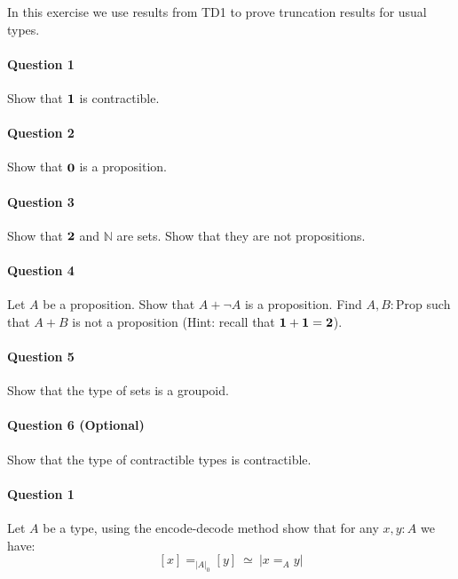 \documentclass{article}[6pt]%
\newcommand{\one}{{\bf 1}}
\newcommand{\zero}{{\bf 0}}
\newcommand{\two}{{\bf 2}}
\newcommand{\Prop}{\mathrm{Prop}}
\begin{document}

\begin{Exercise}
In this exercise we use results from TD1 to prove truncation results for usual types.

\paragraph{Question 1} Show that $\one$ is contractible. %

\paragraph{Question 2} Show that $\zero$ is a proposition.

\paragraph{Question 3} Show that $\two$ and $\mathbb{N}$ are sets. Show that they are not propositions.

\paragraph{Question 4} Let $A$ be a proposition. Show that $A+ \lnot A$ is a proposition. Find $A,B:\Prop$ such that $A+B$ is not a proposition (Hint: recall that $\one+\one = \two$).

\paragraph{Question 5} Show that the type of sets is a groupoid.

\paragraph{Question 6 (Optional)} Show that the type of contractible types is contractible.

\end{Exercise}


\begin{Exercise}[title={Identity types in set-truncations}]
\paragraph{Question 1} Let $A$ be a type, using the encode-decode method show that for any $x,y:A$ we have: 
\[[x]=_{|A|_0}[y]\ \simeq \ |x=_A y|\]
\end{Exercise}
\end{document}
